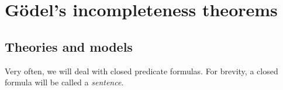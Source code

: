 \section{G\"odel's incompleteness theorems}
\subsection{Theories and models}
Very often, we will deal with closed predicate formulas.
For brevity, a closed formula will be called a \emph{sentence}.
